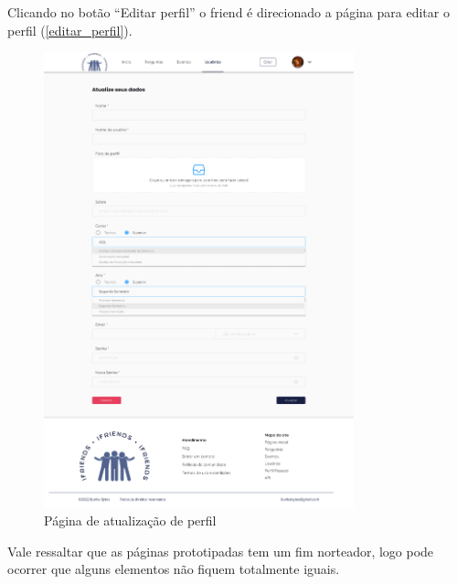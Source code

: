 Clicando no botão ``Editar perfil'' o \gls{friend} é direcionado a página para editar o perfil (\autoref{editar_perfil}).

\begin{figure}[htb]
\centering
\caption{\label{editar_perfil} Página de atualização de perfil}
\includegraphics[width=0.8\textwidth]{anexos/Imagens_Prototipo/com_login/editar_perfil.png}
\end{figure}
\FloatBarrier

Vale ressaltar que as páginas prototipadas tem um fim norteador, logo pode ocorrer que alguns elementos não fiquem totalmente iguais. 